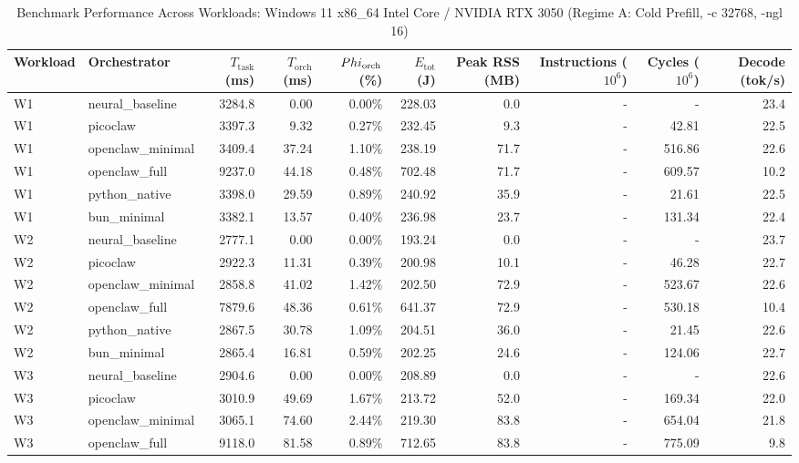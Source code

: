 \begin{table}[t]
\centering\small
\caption{Benchmark Performance Across Workloads: Windows 11 x86_64 Intel Core / NVIDIA RTX 3050 (Regime A: Cold Prefill, -c 32768, -ngl 16)}
\label{tab:Windows_master_summary}
\begin{tabular}{llrrrrrrrr}
\toprule
Workload & Orchestrator & $T_{\text{task}}$ (ms) & $T_{\text{orch}}$ (ms) & $\\Phi_{\text{orch}}$ (\%) & $E_{\text{tot}}$ (J) & Peak RSS (MB) & Instructions ($10^6$) & Cycles ($10^6$) & Decode (tok/s) \\
\midrule
W1 & neural\_baseline & 3284.8 & 0.00 & 0.00\% & 228.03 & 0.0 & - & - & 23.4 \\
W1 & picoclaw & 3397.3 & 9.32 & 0.27\% & 232.45 & 9.3 & - & 42.81 & 22.5 \\
W1 & openclaw\_minimal & 3409.4 & 37.24 & 1.10\% & 238.19 & 71.7 & - & 516.86 & 22.6 \\
W1 & openclaw\_full & 9237.0 & 44.18 & 0.48\% & 702.48 & 71.7 & - & 609.57 & 10.2 \\
W1 & python\_native & 3398.0 & 29.59 & 0.89\% & 240.92 & 35.9 & - & 21.61 & 22.5 \\
W1 & bun\_minimal & 3382.1 & 13.57 & 0.40\% & 236.98 & 23.7 & - & 131.34 & 22.4 \\
\midrule
W2 & neural\_baseline & 2777.1 & 0.00 & 0.00\% & 193.24 & 0.0 & - & - & 23.7 \\
W2 & picoclaw & 2922.3 & 11.31 & 0.39\% & 200.98 & 10.1 & - & 46.28 & 22.7 \\
W2 & openclaw\_minimal & 2858.8 & 41.02 & 1.42\% & 202.50 & 72.9 & - & 523.67 & 22.6 \\
W2 & openclaw\_full & 7879.6 & 48.36 & 0.61\% & 641.37 & 72.9 & - & 530.18 & 10.4 \\
W2 & python\_native & 2867.5 & 30.78 & 1.09\% & 204.51 & 36.0 & - & 21.45 & 22.6 \\
W2 & bun\_minimal & 2865.4 & 16.81 & 0.59\% & 202.25 & 24.6 & - & 124.06 & 22.7 \\
\midrule
W3 & neural\_baseline & 2904.6 & 0.00 & 0.00\% & 208.89 & 0.0 & - & - & 22.6 \\
W3 & picoclaw & 3010.9 & 49.69 & 1.67\% & 213.72 & 52.0 & - & 169.34 & 22.0 \\
W3 & openclaw\_minimal & 3065.1 & 74.60 & 2.44\% & 219.30 & 83.8 & - & 654.04 & 21.8 \\
W3 & openclaw\_full & 9118.0 & 81.58 & 0.89\% & 712.65 & 83.8 & - & 775.09 & 9.8 \\

\end{tabular}
\end{table}
